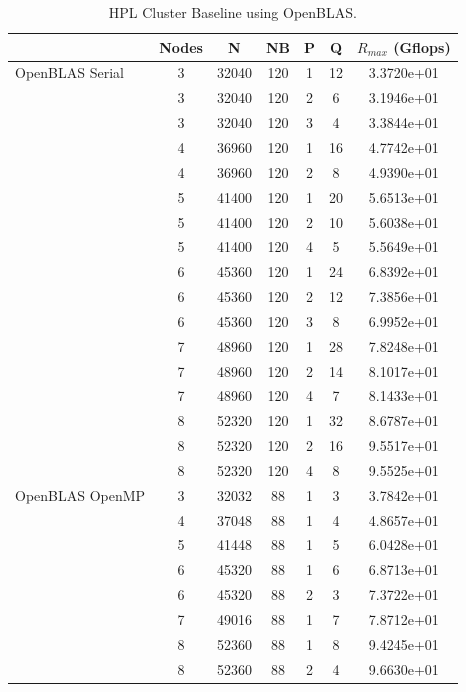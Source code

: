 \documentclass{report}
\begin{document}
\begin{table}
\begin{center}
\begin{tabular}{ |l|c|c|c|c|c|c| } 
\hline
                & Nodes & N & NB & P & Q & $R_{max}$ (Gflops) \\ 
\hline
OpenBLAS Serial & 3 & 32040 & 120 & 1 & 12 & 3.3720e+01 \\ 
                & 3 & 32040 & 120 & 2 &  6 & 3.1946e+01 \\
                & 3 & 32040 & 120 & 3 &  4 & 3.3844e+01 \\
                \cline{2-7} 
                & 4 & 36960 & 120 & 1 & 16 & 4.7742e+01 \\ 
                & 4 & 36960 & 120 & 2 &  8 & 4.9390e+01 \\ 
                \cline{2-7} 
                & 5 & 41400 & 120 & 1 & 20 & 5.6513e+01 \\ 
                & 5 & 41400 & 120 & 2 & 10 & 5.6038e+01 \\ 
                & 5 & 41400 & 120 & 4 &  5 & 5.5649e+01 \\ 
                \cline{2-7} 
                & 6 & 45360 & 120 & 1 & 24 & 6.8392e+01 \\ 
                & 6 & 45360 & 120 & 2 & 12 & 7.3856e+01 \\ 
                & 6 & 45360 & 120 & 3 &  8 & 6.9952e+01 \\ 
                \cline{2-7} 
                & 7 & 48960 & 120 & 1 & 28 & 7.8248e+01 \\ 
                & 7 & 48960 & 120 & 2 & 14 & 8.1017e+01 \\ 
                & 7 & 48960 & 120 & 4 &  7 & 8.1433e+01 \\ 
                \cline{2-7} 
                & 8 & 52320 & 120 & 1 & 32 & 8.6787e+01 \\ 
                & 8 & 52320 & 120 & 2 & 16 & 9.5517e+01 \\ 
                & 8 & 52320 & 120 & 4 &  8 & 9.5525e+01 \\ 
\hline
OpenBLAS OpenMP & 3 & 32032 & 88 & 1 & 3 & 3.7842e+01 \\ 
                \cline{2-7} 
                & 4 & 37048 & 88 & 1 & 4 & 4.8657e+01 \\ 
                \cline{2-7} 
                & 5 & 41448 & 88 & 1 & 5 & 6.0428e+01 \\ 
                \cline{2-7} 
                & 6 & 45320 & 88 & 1 & 6 & 6.8713e+01 \\ 
                & 6 & 45320 & 88 & 2 & 3 & 7.3722e+01 \\ 
                \cline{2-7} 
                & 7 & 49016 & 88 & 1 & 7 & 7.8712e+01 \\ 
                \cline{2-7} 
                & 8 & 52360 & 88 & 1 & 8 & 9.4245e+01 \\ 
                & 8 & 52360 & 88 & 2 & 4 & 9.6630e+01 \\ 
\hline
\end{tabular}
\end{center}
\caption{\label{tab:table-name}HPL Cluster Baseline using OpenBLAS.}
\end{table}
\end{document}
